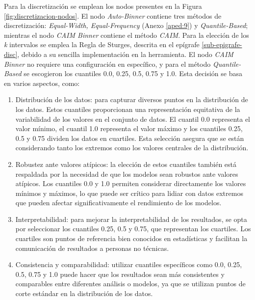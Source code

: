 Para la discretización se emplean los nodos presentes en la Figura \ref{fig:discretizacion-nodos}. El nodo \textit{Auto-Binner} contiene tres métodos de discretización: \textit{Equal-Width, Equal-Frequency} (Anexo \ref{aped:9}) y \textit{Quantile-Based}; mientras el nodo \textit{CAIM Binner} contiene el método \textit{CAIM}. Para la elección de los \textit{k} intervalos se emplea la Regla de Sturges, descrita en el epígrafe \ref{sub-epigrafe-disc}, debido a su sencilla implementación en la herramienta. El nodo \textit{CAIM Binner} no requiere una configuración en específico, y para el método \textit{Quantile-Based} se escogieron los cuantiles 0.0, 0.25, 0.5, 0.75 y 1.0. Esta decisión se basa en varios aspectos, como:
\begin{enumerate}
	\item Distribución de los datos: para capturar diversos puntos en la distribución de los datos. Estos cuantiles proporcionan una representación equitativa de la variabilidad de los valores en el conjunto de datos. El cuantil 0.0 representa el valor mínimo, el cuantil 1.0 representa el valor máximo y los cuantiles 0.25, 0.5 y 0.75 dividen los datos en cuartiles. Esta selección asegura que se están considerando tanto los extremos como los valores centrales de la distribución.
	\item Robustez ante valores atípicos: la elección de estos cuantiles también está respaldada por la necesidad de que los modelos sean robustos ante valores atípicos. Los cuantiles 0.0 y 1.0 permiten considerar directamente los valores mínimos y máximos, lo que puede ser crítico para lidiar con datos extremos que pueden afectar significativamente el rendimiento de los modelos.
	\item Interpretabilidad: para mejorar la interpretabilidad de los resultados, se opta por seleccionar los cuantiles 0.25, 0.5 y 0.75, que representan los cuartiles. Los cuartiles son puntos de referencia bien conocidos en estadísticas y facilitan la comunicación de resultados a personas no técnicas. 
	\item Consistencia y comparabilidad: utilizar cuantiles específicos como 0.0, 0.25, 0.5, 0.75 y 1.0 puede hacer que los resultados sean más consistentes y comparables entre diferentes análisis o modelos, ya que se utilizan puntos de corte estándar en la distribución de los datos.
\end{enumerate}

